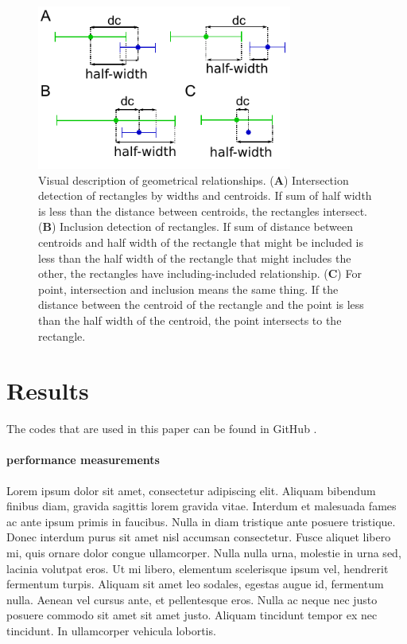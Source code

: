 \documentclass[10pt,letterpaper,twocolumn]{article}
\begin{document}
\begin{figure}[hbt]
    \includegraphics[width=8.4cm, bb=1 9 196 125]{fig2.eps}
    \caption{
    Visual description of geometrical relationships.
    (\textbf{A})
    Intersection detection of rectangles by widths and centroids. If sum of half
    width is less than the distance between centroids, the rectangles intersect.
    (\textbf{B})
    Inclusion detection of rectangles. If sum of distance between centroids and
    half width of the rectangle that might be included is less than the half
    width of the rectangle that might includes the other, the rectangles have
    including-included relationship.
    (\textbf{C})
    For point, intersection and inclusion means the same thing. If the distance
    between the centroid of the rectangle and the point is less than the half
    width of the centroid, the point intersects to the rectangle.
    }
    \label{fig-geometric-relationship}
\end{figure}

\section*{Results}

The codes that are used in this paper can be found in GitHub
\cite{periortree-implementation}.

\paragraph*{performance measurements}
Lorem ipsum dolor sit amet, consectetur adipiscing elit. Aliquam bibendum
finibus diam, gravida sagittis lorem gravida vitae. Interdum et malesuada fames
ac ante ipsum primis in faucibus. Nulla in diam tristique ante posuere
tristique. Donec interdum purus sit amet nisl accumsan consectetur. Fusce
aliquet libero mi, quis ornare dolor congue ullamcorper. Nulla nulla urna,
molestie in urna sed, lacinia volutpat eros. Ut mi libero, elementum scelerisque
ipsum vel, hendrerit fermentum turpis. Aliquam sit amet leo sodales, egestas
augue id, fermentum nulla. Aenean vel cursus ante, et pellentesque eros. Nulla
ac neque nec justo posuere commodo sit amet sit amet justo. Aliquam tincidunt
tempor ex nec tincidunt. In ullamcorper vehicula lobortis.
\end{document}
